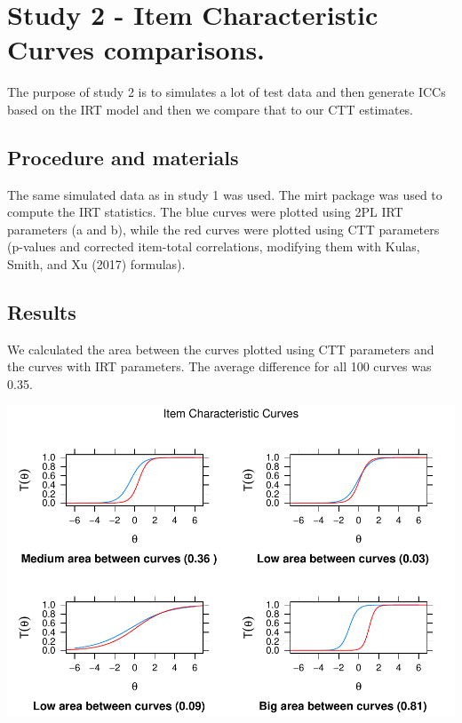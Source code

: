 \documentclass[
  english,
  man,floatsintext]{apa6}
\begin{document}
\hypertarget{study-2---item-characteristic-curves-comparisons.}{%
\section{Study 2 - Item Characteristic Curves comparisons.}\label{study-2---item-characteristic-curves-comparisons.}}

The purpose of study 2 is to simulates a lot of test data and then generate ICCs based on the IRT model and then we compare that to our CTT estimates.

\hypertarget{procedure-and-materials}{%
\subsection{Procedure and materials}\label{procedure-and-materials}}

The same simulated data as in study 1 was used. The mirt package was used to compute the IRT statistics. The blue curves were plotted using 2PL IRT parameters (a and b), while the red curves were plotted using CTT parameters (p-values and corrected item-total correlations, modifying them with Kulas, Smith, and Xu (2017) formulas).

\hypertarget{results-1}{%
\subsection{Results}\label{results-1}}

We calculated the area between the curves plotted using CTT parameters and the curves with IRT parameters. The average difference for all 100 curves was 0.35.

\includegraphics{ICC_project_files/figure-latex/plotting-1.pdf}
\end{document}
